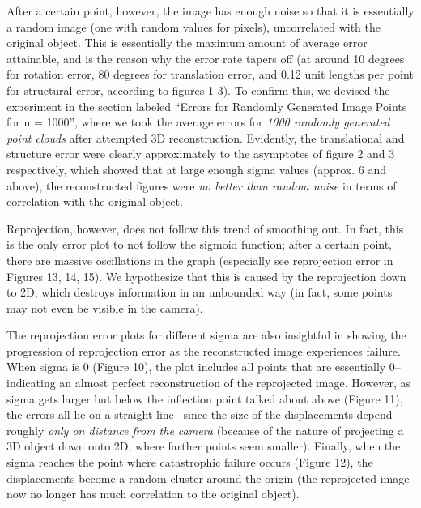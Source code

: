 \documentclass{article}
\begin{document}
After a certain point, however, the image has enough noise so that it is essentially a random image (one with random values for pixels), uncorrelated with the original object. This is essentially the maximum amount of average error attainable, and is the reason why the error rate tapers off (at around 10 degrees for rotation error, 80 degrees for translation error, and 0.12 unit lengths per point for structural error, according to figures 1-3). To confirm this, we devised the experiment in the section labeled ``Errors for Randomly Generated Image Points for n = 1000'', where we took the average errors for \textit{1000 randomly generated point clouds} after attempted 3D reconstruction. Evidently, the translational and structure error were clearly approximately to the asymptotes of figure 2 and 3 respectively, which showed that at large enough sigma values (approx. 6 and above), the reconstructed figures were \textit{no better than random noise} in terms of correlation with the original object.




Reprojection, however, does not follow this trend of smoothing out. In fact, this is the only error plot to not follow the sigmoid function; after a certain point, there are massive oscillations in the graph (especially see reprojection error in Figures 13, 14, 15). We hypothesize that this is caused by the reprojection down to 2D, which destroys information in an unbounded way (in fact, some points may not even be visible in the camera).




The reprojection error plots for different sigma are also insightful in showing the progression of reprojection error as the reconstructed image experiences failure. When sigma is 0 (Figure 10), the plot includes all points that are essentially 0-- indicating an almost perfect reconstruction of the reprojected image. However, as sigma gets larger but below the inflection point talked about above (Figure 11), the errors all lie on a straight line-- since the size of the displacements depend roughly \textit{only on distance from the camera} (because of the nature of projecting a 3D object down onto 2D, where farther points seem smaller). Finally, when the sigma reaches the point where catastrophic failure occurs (Figure 12), the displacements become a random cluster around the origin (the reprojected image now no longer has much correlation to the original object). %
\end{document}
